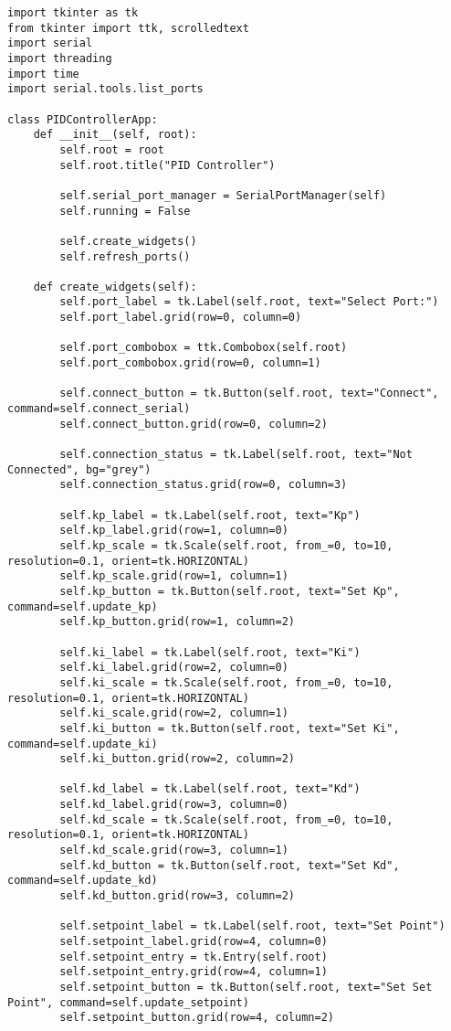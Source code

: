 \documentclass{article}
\begin{document}
\begin{verbatim}
import tkinter as tk
from tkinter import ttk, scrolledtext
import serial
import threading
import time
import serial.tools.list_ports

class PIDControllerApp:
    def __init__(self, root):
        self.root = root
        self.root.title("PID Controller")

        self.serial_port_manager = SerialPortManager(self)
        self.running = False

        self.create_widgets()
        self.refresh_ports()

    def create_widgets(self):
        self.port_label = tk.Label(self.root, text="Select Port:")
        self.port_label.grid(row=0, column=0)

        self.port_combobox = ttk.Combobox(self.root)
        self.port_combobox.grid(row=0, column=1)

        self.connect_button = tk.Button(self.root, text="Connect", command=self.connect_serial)
        self.connect_button.grid(row=0, column=2)

        self.connection_status = tk.Label(self.root, text="Not Connected", bg="grey")
        self.connection_status.grid(row=0, column=3)

        self.kp_label = tk.Label(self.root, text="Kp")
        self.kp_label.grid(row=1, column=0)
        self.kp_scale = tk.Scale(self.root, from_=0, to=10, resolution=0.1, orient=tk.HORIZONTAL)
        self.kp_scale.grid(row=1, column=1)
        self.kp_button = tk.Button(self.root, text="Set Kp", command=self.update_kp)
        self.kp_button.grid(row=1, column=2)

        self.ki_label = tk.Label(self.root, text="Ki")
        self.ki_label.grid(row=2, column=0)
        self.ki_scale = tk.Scale(self.root, from_=0, to=10, resolution=0.1, orient=tk.HORIZONTAL)
        self.ki_scale.grid(row=2, column=1)
        self.ki_button = tk.Button(self.root, text="Set Ki", command=self.update_ki)
        self.ki_button.grid(row=2, column=2)

        self.kd_label = tk.Label(self.root, text="Kd")
        self.kd_label.grid(row=3, column=0)
        self.kd_scale = tk.Scale(self.root, from_=0, to=10, resolution=0.1, orient=tk.HORIZONTAL)
        self.kd_scale.grid(row=3, column=1)
        self.kd_button = tk.Button(self.root, text="Set Kd", command=self.update_kd)
        self.kd_button.grid(row=3, column=2)

        self.setpoint_label = tk.Label(self.root, text="Set Point")
        self.setpoint_label.grid(row=4, column=0)
        self.setpoint_entry = tk.Entry(self.root)
        self.setpoint_entry.grid(row=4, column=1)
        self.setpoint_button = tk.Button(self.root, text="Set Set Point", command=self.update_setpoint)
        self.setpoint_button.grid(row=4, column=2)


\end{verbatim}
\end{document}
